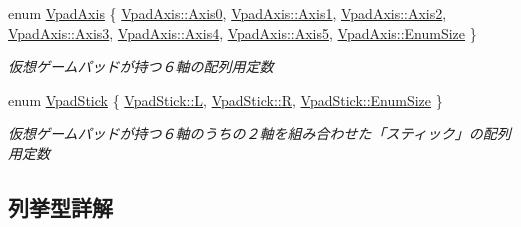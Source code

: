 \begin{DoxyCompactItemize}
enum \mbox{\hyperlink{namespace_k___input_ae7980bb169b8a865a5e67d6fe06fb729}{Vpad\+Axis}} \{ \newline
\mbox{\hyperlink{namespace_k___input_ae7980bb169b8a865a5e67d6fe06fb729a6c870de5687f4ee17425bfa3c253b259}{Vpad\+Axis\+::\+Axis0}}, 
\mbox{\hyperlink{namespace_k___input_ae7980bb169b8a865a5e67d6fe06fb729a5247a5bb0ccea0ec521a5b96ec2282ff}{Vpad\+Axis\+::\+Axis1}}, 
\mbox{\hyperlink{namespace_k___input_ae7980bb169b8a865a5e67d6fe06fb729a297fc5a4ffce7c98e434e4292bcef97e}{Vpad\+Axis\+::\+Axis2}}, 
\mbox{\hyperlink{namespace_k___input_ae7980bb169b8a865a5e67d6fe06fb729ad2294667d8b7761f6f0b5f60ca86768c}{Vpad\+Axis\+::\+Axis3}}, 
\newline
\mbox{\hyperlink{namespace_k___input_ae7980bb169b8a865a5e67d6fe06fb729a3133c9542e780061be2699d3db0eaf4a}{Vpad\+Axis\+::\+Axis4}}, 
\mbox{\hyperlink{namespace_k___input_ae7980bb169b8a865a5e67d6fe06fb729a5556e61cbc0ac05dba289b93dfb86bd8}{Vpad\+Axis\+::\+Axis5}}, 
\mbox{\hyperlink{namespace_k___input_ae7980bb169b8a865a5e67d6fe06fb729a1831c6ae7202fe5c450ac301df5245a0}{Vpad\+Axis\+::\+Enum\+Size}}
 \}
\begin{DoxyCompactList}\small\item\em 仮想ゲームパッドが持つ６軸の配列用定数 \end{DoxyCompactList}\item 
enum \mbox{\hyperlink{namespace_k___input_a18bb7eb174cac2fd54b7a5b0d02a0116}{Vpad\+Stick}} \{ \mbox{\hyperlink{namespace_k___input_a18bb7eb174cac2fd54b7a5b0d02a0116ad20caec3b48a1eef164cb4ca81ba2587}{Vpad\+Stick\+::L}}, 
\mbox{\hyperlink{namespace_k___input_a18bb7eb174cac2fd54b7a5b0d02a0116ae1e1d3d40573127e9ee0480caf1283d6}{Vpad\+Stick\+::R}}, 
\mbox{\hyperlink{namespace_k___input_a18bb7eb174cac2fd54b7a5b0d02a0116a1831c6ae7202fe5c450ac301df5245a0}{Vpad\+Stick\+::\+Enum\+Size}}
 \}
\begin{DoxyCompactList}\small\item\em 仮想ゲームパッドが持つ６軸のうちの２軸を組み合わせた「スティック」の配列用定数 \end{DoxyCompactList}\end{DoxyCompactItemize}


\subsection{列挙型詳解}
\mbox{\label{namespace_k___input_a82230ae06723a21cc710ae3d66fd078f}} 
